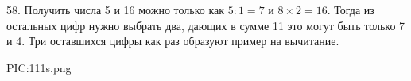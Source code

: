 58. Получить числа 5 и 16 можно только как $5:1=7$ и $8\times2=16.$ Тогда из остальных цифр нужно выбрать два, дающих в сумме 11 это могут быть только 7 и 4. Три оставшихся цифры как раз образуют пример на вычитание.
\begin{center}
{{PIC:111s.png}}
\end{center}
